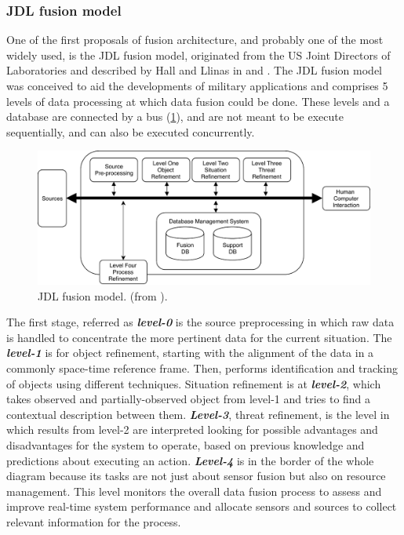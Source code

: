 \subsubsection{JDL fusion model}

One of the first proposals of fusion architecture, and probably one of the most widely used, is the JDL fusion model, originated from the US Joint Directors of Laboratories and described by Hall and Llinas in \cite{Hall1997} and \cite{Llinas1998}. The JDL fusion model was conceived to aid the developments of military applications and comprises 5 levels of data processing at which data fusion could be done. These levels and a database are connected by a bus (\ref{JDLmodel}), and are not meant to be execute sequentially, and can also be executed concurrently. 

\begin{figure}[ht!]
\centering
\includegraphics[scale=0.7]{fig/2/jdlmodel.pdf}
\caption{JDL fusion model. (from \cite{Hall1997}).}
\label{JDLmodel}
\end{figure}


The first stage, referred as \textbf{\textit{level-0}} is the source preprocessing in which raw data is handled to concentrate the more pertinent data for the current situation. The \textbf{\textit{level-1}} is for object refinement, starting with the alignment of the data in a commonly space-time reference frame. Then, performs identification and tracking of objects using different techniques. Situation refinement is at \textbf{\textit{level-2}}, which takes observed and partially-observed object from level-1 and tries to find a contextual description between them. \textbf{\textit{Level-3}}, threat refinement, is the level in which results from level-2 are interpreted looking for possible advantages and disadvantages for the system to operate, based on previous knowledge and predictions about executing an action. \textbf{\textit{Level-4}} is in the border of the whole diagram because its tasks are not just about sensor fusion but also on resource management. This level monitors the overall
data fusion process to assess and improve real-time system performance and allocate sensors and sources to collect relevant information for the process.

